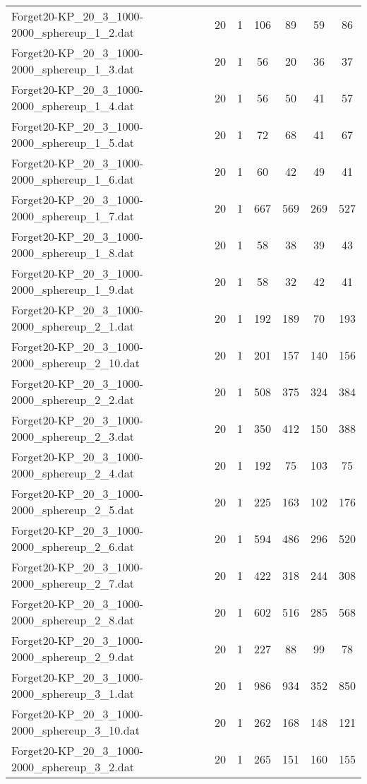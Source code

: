\begin{table}[!ht]
\begin{tabular}{lcccccc}
Forget20-KP\_20\_3\_1000-2000\_sphereup\_1\_2.dat & 20 & 1 & 106 & 89 & 59 & 86 \\
Forget20-KP\_20\_3\_1000-2000\_sphereup\_1\_3.dat & 20 & 1 & 56 & 20 & 36 & 37 \\
Forget20-KP\_20\_3\_1000-2000\_sphereup\_1\_4.dat & 20 & 1 & 56 & 50 & 41 & 57 \\
Forget20-KP\_20\_3\_1000-2000\_sphereup\_1\_5.dat & 20 & 1 & 72 & 68 & 41 & 67 \\
Forget20-KP\_20\_3\_1000-2000\_sphereup\_1\_6.dat & 20 & 1 & 60 & 42 & 49 & 41 \\
Forget20-KP\_20\_3\_1000-2000\_sphereup\_1\_7.dat & 20 & 1 & 667 & 569 & 269 & 527 \\
Forget20-KP\_20\_3\_1000-2000\_sphereup\_1\_8.dat & 20 & 1 & 58 & 38 & 39 & 43 \\
Forget20-KP\_20\_3\_1000-2000\_sphereup\_1\_9.dat & 20 & 1 & 58 & 32 & 42 & 41 \\
Forget20-KP\_20\_3\_1000-2000\_sphereup\_2\_1.dat & 20 & 1 & 192 & 189 & 70 & 193 \\
Forget20-KP\_20\_3\_1000-2000\_sphereup\_2\_10.dat & 20 & 1 & 201 & 157 & 140 & 156 \\
Forget20-KP\_20\_3\_1000-2000\_sphereup\_2\_2.dat & 20 & 1 & 508 & 375 & 324 & 384 \\
Forget20-KP\_20\_3\_1000-2000\_sphereup\_2\_3.dat & 20 & 1 & 350 & 412 & 150 & 388 \\
Forget20-KP\_20\_3\_1000-2000\_sphereup\_2\_4.dat & 20 & 1 & 192 & 75 & 103 & 75 \\
Forget20-KP\_20\_3\_1000-2000\_sphereup\_2\_5.dat & 20 & 1 & 225 & 163 & 102 & 176 \\
Forget20-KP\_20\_3\_1000-2000\_sphereup\_2\_6.dat & 20 & 1 & 594 & 486 & 296 & 520 \\
Forget20-KP\_20\_3\_1000-2000\_sphereup\_2\_7.dat & 20 & 1 & 422 & 318 & 244 & 308 \\
Forget20-KP\_20\_3\_1000-2000\_sphereup\_2\_8.dat & 20 & 1 & 602 & 516 & 285 & 568 \\
Forget20-KP\_20\_3\_1000-2000\_sphereup\_2\_9.dat & 20 & 1 & 227 & 88 & 99 & 78 \\
Forget20-KP\_20\_3\_1000-2000\_sphereup\_3\_1.dat & 20 & 1 & 986 & 934 & 352 & 850 \\
Forget20-KP\_20\_3\_1000-2000\_sphereup\_3\_10.dat & 20 & 1 & 262 & 168 & 148 & 121 \\
Forget20-KP\_20\_3\_1000-2000\_sphereup\_3\_2.dat & 20 & 1 & 265 & 151 & 160 & 155 \\

\end{tabular}
\end{table}
